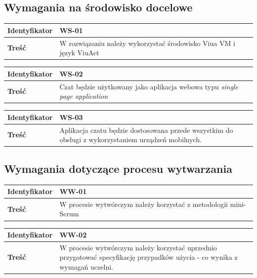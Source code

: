 \subsection{Wymagania na środowisko docelowe}

\begin{tabular}{ | l | l | }
	\hline
		\textbf{Identyfikator} &
	WS-01
		\\

	\hline
		\textbf{Treść} & \parbox[t]{13cm}{
			W rozwiązaniu należy wykorzystać środowisko Viua VM i
			język ViuAct
		}\\

	\hline
\end{tabular}

\begin{tabular}{ | l | l | }
	\hline
		\textbf{Identyfikator} &
	WS-02
		\\

	\hline
		\textbf{Treść} & \parbox[t]{13cm}{
			Czat będzie użytkowany jako aplikacja webowa typu
			\textit{single page application}
		}\\

	\hline
\end{tabular}

\begin{tabular}{ | l | l | }
	\hline
		\textbf{Identyfikator} &
	WS-03
		\\

	\hline
		\textbf{Treść} & \parbox[t]{13cm}{
			Aplikacja czatu będzie dostosowana przede wszystkim
			do obsługi z wykorzystaniem urządzeń mobilnych.
		}\\

	\hline
\end{tabular}

\subsection{Wymagania dotyczące procesu wytwarzania}

\begin{tabular}{ | l | l | }
	\hline
		\textbf{Identyfikator} &
	WW-01
		\\

	\hline
		\textbf{Treść} & \parbox[t]{13cm}{
			W procesie wytwórczym należy korzystać z metodologii
			mini-Scrum
		}\\

	\hline
\end{tabular}

\begin{tabular}{ | l | l | }
	\hline
		\textbf{Identyfikator} &
	WW-02
		\\

	\hline
		\textbf{Treść} & \parbox[t]{13cm}{
			W procesie wytwórczym należy korzystać uprzednio przygotować specyfikację przypadków użycia - co wynika z wymagań uczelni.
		}\\

	\hline
\end{tabular}
